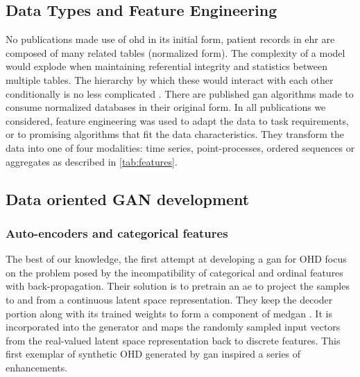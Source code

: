             

    \subsection{Data Types and Feature Engineering}

        No publications made use of \gls{ohd} in its initial form, patient records in \gls{ehr} are composed of many related tables (normalized form). The complexity of a model would explode when maintaining referential integrity and statistics between multiple tables. The hierarchy by which these would interact with each other conditionally is no less complicated \cite{Buda2015, Patki_2016, Zhang2015, Tay2013}. There are published \gls{gan} algorithms made to consume normalized databases in their original form. In all publications we considered, feature engineering was used to adapt the data to task requirements, or to promising algorithms that fit the data characteristics. They transform the data into one of four modalities: time series, point-processes, ordered sequences or aggregates as described in \ref{tab:features}.

        

    \subsection{Data oriented GAN development}\label{subsec:data_gan_dev}

        \subsubsection{Auto-encoders and categorical features}\label{subsubsec:categorical}

            The best of our knowledge, the first attempt at developing a \gls{gan} for OHD \citeauthor{Choi2017-nt} focus on the problem posed by the incompatibility of categorical and ordinal features with back-propagation. Their solution is to pretrain an \gls{ae} to project the samples to and from a continuous latent space representation. They keep the decoder portion along with its trained weights to form a component of \gls{medgan} \cite{Choi2017-nt}. It is incorporated into the generator and maps the randomly sampled input vectors from the real-valued latent space representation back to discrete features. This first exemplar of synthetic OHD generated by \gls{gan} inspired a series of enhancements.\par
            
